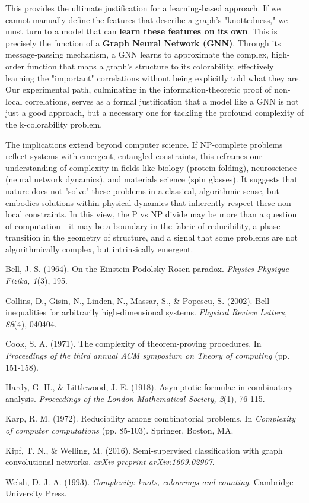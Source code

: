 \documentclass[12pt, letterpaper]{article}
\begin{document}
This provides the ultimate justification for a learning-based approach. If we cannot manually define the features that describe a graph's "knottedness," we must turn to a model that can \textbf{learn these features on its own}. This is precisely the function of a \textbf{Graph Neural Network (GNN)}. Through its message-passing mechanism, a GNN learns to approximate the complex, high-order function that maps a graph's structure to its colorability, effectively learning the "important" correlations without being explicitly told what they are. Our experimental path, culminating in the information-theoretic proof of non-local correlations, serves as a formal justification that a model like a GNN is not just a good approach, but a necessary one for tackling the profound complexity of the k-colorability problem.

The implications extend beyond computer science. If NP-complete problems reflect systems with emergent, entangled constraints, this reframes our understanding of complexity in fields like biology (protein folding), neuroscience (neural network dynamics), and materials science (spin glasses). It suggests that nature does not "solve" these problems in a classical, algorithmic sense, but embodies solutions within physical dynamics that inherently respect these non-local constraints. In this view, the P vs NP divide may be more than a question of computation---it may be a boundary in the fabric of reducibility, a phase transition in the geometry of structure, and a signal that some problems are not algorithmically complex, but intrinsically emergent.

\begin{thebibliography}{99}
     Bell, J. S. (1964). On the Einstein Podolsky Rosen paradox. \textit{Physics Physique Fizika, 1}(3), 195.

     Collins, D., Gisin, N., Linden, N., Massar, S., \& Popescu, S. (2002). Bell inequalities for arbitrarily high-dimensional systems. \textit{Physical Review Letters, 88}(4), 040404.
    
     Cook, S. A. (1971). The complexity of theorem-proving procedures. In \textit{Proceedings of the third annual ACM symposium on Theory of computing} (pp. 151-158).
    
     Hardy, G. H., \& Littlewood, J. E. (1918). Asymptotic formulae in combinatory analysis. \textit{Proceedings of the London Mathematical Society, 2}(1), 76-115.

     Karp, R. M. (1972). Reducibility among combinatorial problems. In \textit{Complexity of computer computations} (pp. 85-103). Springer, Boston, MA.
        
     Kipf, T. N., \& Welling, M. (2016). Semi-supervised classification with graph convolutional networks. \textit{arXiv preprint arXiv:1609.02907}.
    
     Welsh, D. J. A. (1993). \textit{Complexity: knots, colourings and counting}. Cambridge University Press.

\end{thebibliography}
\end{document}
